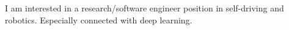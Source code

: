
% 
%

%
I am interested in a research/software engineer position in self-driving and robotics. Especially connected with deep learning.
% 
%